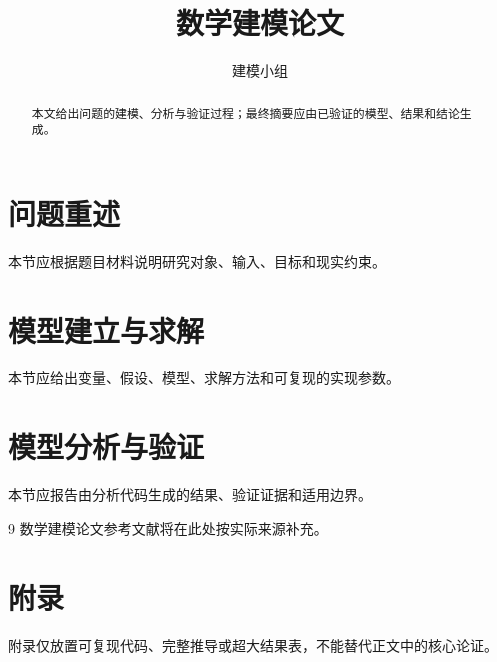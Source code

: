 \documentclass[UTF8,a4paper]{ctexart}
\title{数学建模论文}
\author{建模小组}
\date{}
\begin{document}
\maketitle
\begin{abstract}
本文给出问题的建模、分析与验证过程；最终摘要应由已验证的模型、结果和结论生成。
\end{abstract}

\clearpage
\label{mm:body-start}
\section{问题重述}
本节应根据题目材料说明研究对象、输入、目标和现实约束。
\section{模型建立与求解}
本节应给出变量、假设、模型、求解方法和可复现的实现参数。
\section{模型分析与验证}
本节应报告由分析代码生成的结果、验证证据和适用边界。
\label{mm:body-end}

\clearpage
\label{mm:references-start}
\begin{thebibliography}{9}
数学建模论文参考文献将在此处按实际来源补充。
\end{thebibliography}
\label{mm:references-end}

\clearpage
\label{mm:appendix-start}
\appendix
\section{附录}
附录仅放置可复现代码、完整推导或超大结果表，不能替代正文中的核心论证。
\label{mm:appendix-end}
\end{document}
